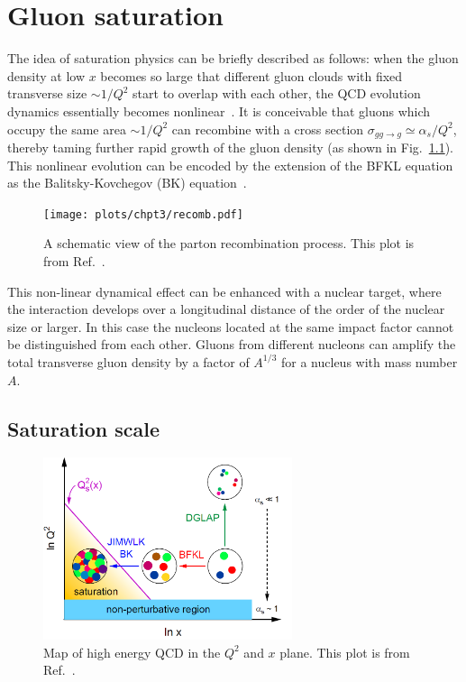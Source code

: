 \chapter{Gluon saturation}
\label{chp:saturation}

The idea of saturation physics can be briefly described as follows: when the
gluon density at low $x$ becomes so large that different gluon clouds with fixed
transverse size $\sim 1/Q^{2}$ start to overlap with each other, the QCD
evolution dynamics essentially becomes nonlinear~\cite{Gribov:1984tu,Mueller:1985wy}. 
It is conceivable that gluons which occupy the same area $\sim 1/Q^{2}$ can recombine with a cross section $\sigma_{gg\rightarrow g}\simeq \alpha_{s}/Q^{2}$, thereby taming further
rapid growth of the gluon density (as shown in Fig.~\ref{fig:recombine}). This nonlinear evolution can be encoded by the extension of the BFKL
equation as the Balitsky-Kovchegov (BK) equation~\cite{Balitsky:1995ub}.
\begin{figure}
\centering
\texttt{[image: plots/chpt3/recomb.pdf]}
\caption[A schematic view of parton recombination process]{
A schematic view of the parton recombination process. This plot is from Ref.~\cite{Accardi:2012qut}.}
\label{fig:recombine}
\end{figure}

This non-linear dynamical effect can be enhanced with a nuclear target, where the
interaction develops over a longitudinal distance of the order of the nuclear size
or larger. 
In this case the nucleons located at the same impact factor
cannot be distinguished from each other. Gluons from different nucleons can
amplify the total transverse gluon density by a factor of $A^{1/3}$ for a
nucleus with mass number $A$. 

\section{Saturation scale}

\begin{figure}
\centering
\includegraphics[width=0.65\textwidth]{plots/chpt3/Q2Vx_map.png}
\caption[Evolution approaches in $Q^{2}$ vs $x$ plane]{
Map of high energy QCD in the $Q^{2}$ and $x$ plane. This plot is from Ref.~\cite{Accardi:2012qut}.}
\label{fig:Q2vX_map}
\end{figure}

